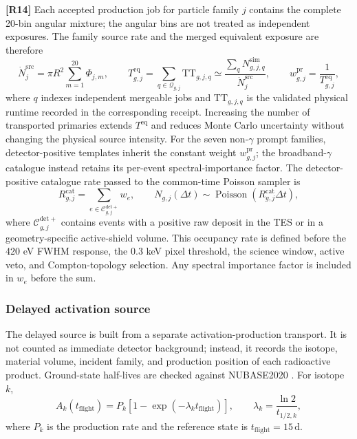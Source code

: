 \documentclass[11pt]{article}
\begin{document}
\begingroup
\color{revisionblue}
\noindent\textbf{[R14]} Each accepted production job for particle family $j$
contains the complete 20-bin angular mixture; the angular bins are not treated
as independent exposures. The family source rate and the merged equivalent
exposure are therefore
\begin{equation}
 \dot N^{\mathrm{src}}_{j}=\pi R^2\sum_{m=1}^{20}\Phi_{j,m},
 \qquad
 T^{\mathrm{eq}}_{g,j}=\sum_{q\in\mathcal Q_{g,j}}\mathrm{TT}_{g,j,q}
 \simeq
 \frac{\sum_q N^{\mathrm{sim}}_{g,j,q}}{\dot N^{\mathrm{src}}_{j}},
 \qquad
 w^{\mathrm{pr}}_{g,j}=\frac{1}{T^{\mathrm{eq}}_{g,j}},
 \label{eq:prompt_equivalent_exposure}
\end{equation}
where $q$ indexes independent mergeable jobs and $\mathrm{TT}_{g,j,q}$ is the
validated physical runtime recorded in the corresponding receipt. Increasing
the number of transported primaries extends $T^{\mathrm{eq}}$ and reduces Monte
Carlo uncertainty without changing the physical source intensity. For the
seven non-$\gamma$ prompt families, detector-positive templates inherit the
constant weight $w^{\mathrm{pr}}_{g,j}$; the broadband-$\gamma$ catalogue instead
retains its per-event spectral-importance factor. The detector-positive
catalogue rate passed to the common-time Poisson sampler is
\begin{equation}
 R^{\mathrm{cat}}_{g,j}=\sum_{e\in\mathcal C^{\mathrm{det+}}_{g,j}}w_e,
 \qquad
 N_{g,j}(\Delta t)\sim
 \operatorname{Poisson}\!\left(R^{\mathrm{cat}}_{g,j}\Delta t\right),
 \label{eq:catalog_poisson_rate}
\end{equation}
where $\mathcal C^{\mathrm{det+}}_{g,j}$ contains events with a positive raw
deposit in the TES or in a geometry-specific active-shield volume. This occupancy rate is
defined before the 420 eV FWHM response, the 0.3 keV pixel threshold, the
science window, active veto, and Compton-topology selection. Any spectral
importance factor is included in $w_e$ before the sum.
\endgroup

\subsubsection{Delayed activation source}
\label{subsec:delayed_source}

The delayed source is built from a separate activation-production transport. It
is not counted as immediate detector background; instead, it records the isotope,
material volume, incident family, and production position of each radioactive
product. Ground-state half-lives are checked against NUBASE2020
\cite{Kondev2021NUBASE}. For isotope $k$,
\begin{equation}
  A_k(t_{\mathrm{flight}})=P_k\left[1-\exp(-\lambda_k t_{\mathrm{flight}})\right],
  \qquad \lambda_k=\frac{\ln2}{t_{1/2,k}},
\end{equation}
where $P_k$ is the production rate and the reference state is
$t_{\mathrm{flight}}=15\,\mathrm{d}$.
\end{document}

